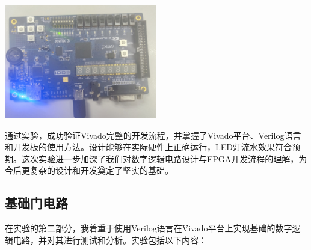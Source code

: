 \documentclass[a4,10pt,zihao=-4]{ctexart}
\begin{document}
\begin{enumerate}
  \includegraphics[width=0.5\textwidth]{流水灯1.jpg}

\end{enumerate}

通过实验，成功验证Vivado完整的开发流程，并掌握了Vivado平台、Verilog语言和开发板的使用方法。设计能够在实际硬件上正确运行，LED灯流水效果符合预期。这次实验进一步加深了我们对数字逻辑电路设计与FPGA开发流程的理解，为今后更复杂的设计和开发奠定了坚实的基础。

\subsection{基础门电路}

在实验的第二部分，我着重于使用Verilog语言在Vivado平台上实现基础的数字逻辑电路，并对其进行测试和分析。实验包括以下内容：
\end{document}

